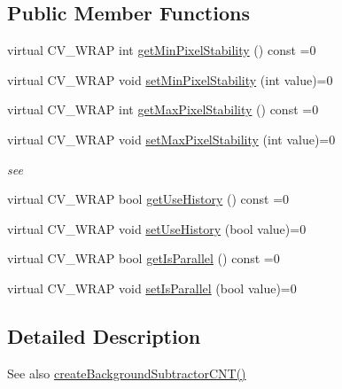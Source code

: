 \subsection*{Public Member Functions}
\begin{DoxyCompactItemize}
\item 
virtual C\+V\+\_\+\+W\+R\+AP int \hyperlink{classcv_1_1bgsubcnt_1_1BackgroundSubtractorCNT_ae989dd01f33c289a21b995ee9c69c600}{get\+Min\+Pixel\+Stability} () const =0
\item 
virtual C\+V\+\_\+\+W\+R\+AP void \hyperlink{classcv_1_1bgsubcnt_1_1BackgroundSubtractorCNT_a7fe9be675d4c1995123a60d56db75422}{set\+Min\+Pixel\+Stability} (int value)=0
\item 
virtual C\+V\+\_\+\+W\+R\+AP int \hyperlink{classcv_1_1bgsubcnt_1_1BackgroundSubtractorCNT_ac45a2faa6b753624cbbff9d341cdd3db}{get\+Max\+Pixel\+Stability} () const =0
\item 
virtual C\+V\+\_\+\+W\+R\+AP void \hyperlink{classcv_1_1bgsubcnt_1_1BackgroundSubtractorCNT_a3414551506bf27dda254dd245bfa8e03}{set\+Max\+Pixel\+Stability} (int value)=0
\begin{DoxyCompactList}\small\item\em see \end{DoxyCompactList}\item 
virtual C\+V\+\_\+\+W\+R\+AP bool \hyperlink{classcv_1_1bgsubcnt_1_1BackgroundSubtractorCNT_a86315a974023e507fdc7a40bba177399}{get\+Use\+History} () const =0
\item 
virtual C\+V\+\_\+\+W\+R\+AP void \hyperlink{classcv_1_1bgsubcnt_1_1BackgroundSubtractorCNT_ab2da57637e04beecbe8d812e00a54c52}{set\+Use\+History} (bool value)=0
\item 
virtual C\+V\+\_\+\+W\+R\+AP bool \hyperlink{classcv_1_1bgsubcnt_1_1BackgroundSubtractorCNT_a2e31e009b3901e4a1e43edf7e87cba51}{get\+Is\+Parallel} () const =0
\item 
virtual C\+V\+\_\+\+W\+R\+AP void \hyperlink{classcv_1_1bgsubcnt_1_1BackgroundSubtractorCNT_ab7d88f5d064b3c5cb0a18e80bd0bc265}{set\+Is\+Parallel} (bool value)=0
\end{DoxyCompactItemize}


\subsection{Detailed Description}
\begin{DoxySeeAlso}{See also}
\hyperlink{bgsubcnt_8h_a6a6efd913954320be33f39c32a4c5a7e}{create\+Background\+Subtractor\+C\+N\+T()} 
\end{DoxySeeAlso}


